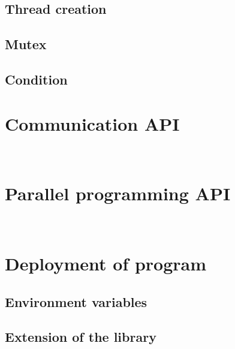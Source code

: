 \documentclass[12pt]{report}
\begin{document}
\subsection{Thread creation}

\subsection{Mutex}

\subsection{Condition}

\section{Communication API}\label{comapi}
\\

\section{Parallel programming API}
\\

\section{Deployment of program}

\subsection{Environment variables}\label{envvar}

\subsection{Extension of the library}
\end{document}
